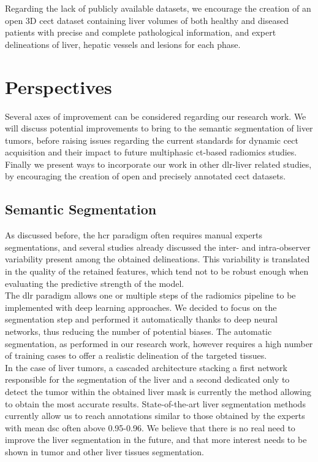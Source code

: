 Regarding the lack of publicly available datasets, we encourage the
creation of an open 3D \ac{cect} dataset containing liver volumes of both
healthy and diseased patients with precise and complete pathological
information, and expert delineations of liver, hepatic vessels and
lesions for each phase.


\section*{Perspectives}
\label{sec:Perspectives}

Several axes of improvement can be considered regarding our research work.
We will discuss potential improvements to bring to the 
semantic segmentation of liver tumors, before raising issues regarding
the current standards for dynamic \ac{cect} acquisition and their impact to 
future multiphasic \ac{ct}-based radiomics studies.
Finally we present ways to incorporate our work in other \ac{dlr}-liver related 
studies, by encouraging the creation of open and precisely 
annotated \ac{cect} datasets.

\subsection*{Semantic Segmentation}
\label{subsec:SemanticSeg}

As discussed before, the \ac{hcr} paradigm often requires manual experts
segmentations, and several studies already discussed the inter- and
intra-observer variability present among the obtained delineations. This
variability is translated in the quality of the retained features, which
tend not to be robust enough when evaluating the predictive 
strength of the model.\\
The \ac{dlr} paradigm allows one or multiple steps of the radiomics pipeline to be implemented with deep learning approaches. We decided to focus on the segmentation step and performed it automatically thanks to deep neural networks, thus reducing the number of potential biases. The automatic segmentation, as
performed in our research work, however requires a high number of
training cases to offer a realistic delineation of the targeted tissues.\\
In the case of liver tumors, a cascaded architecture stacking a first
network responsible for the segmentation of the liver and a second
dedicated only to detect the tumor within the obtained liver mask is
currently the method allowing to obtain the most accurate results.
State-of-the-art liver segmentation methods currently allow us to reach
annotations similar to those obtained by the experts with mean \ac{dsc} often
above 0.95-0.96. We believe that there is no real need to improve the
liver segmentation in the future, and that more interest needs to be
shown in tumor and other liver tissues segmentation.

